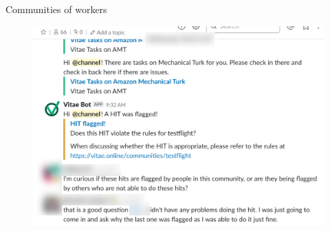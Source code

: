 \documentclass[presentation]{subfiles}
\begin{document}
\begin{frame}[b]{Communities of workers}
\vspace{2em}
\begin{figure}
  \includegraphics[width=.6\textwidth]{../common_figures/vitae/discussion.png}
  \end{figure}
\end{frame}
\end{document}
